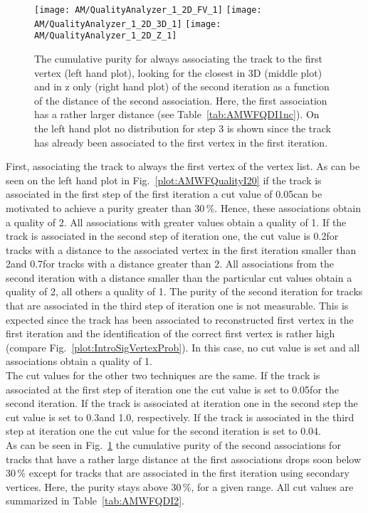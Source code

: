 \begin{figure}[!ht]
    \centering
    \texttt{[image: AM/QualityAnalyzer\_1\_2D\_FV\_1]}
    \texttt{[image: AM/QualityAnalyzer\_1\_2D\_3D\_1]}
    \texttt{[image: AM/QualityAnalyzer\_1\_2D\_Z\_1]}
    \caption[Cumulative purity of iteration two vs relative difference to define quality for larger distances of association one]{The cumulative purity for always associating the track to the first vertex (left hand plot), looking for the closest in 3D (middle plot) and in z only (right hand plot) of the second iteration as a function of the distance of the second association. Here, the first association has a rather larger distance (see Table~\ref{tab:AMWFQDI1nc}). On the left hand plot no distribution for step 3 is shown since the track has already been associated to the first vertex in the first iteration. \label{plot:AMWFQualityI21}}
\end{figure}

First, associating the track to always the first vertex of the vertex list. As can be seen on the left hand plot in Fig.~\ref{plot:AMWFQualityI20} if the track is associated in the first step of the first iteration a cut value of 0.05\cm can be motivated to achieve a purity greater than $30\,\%$. Hence, these associations obtain a quality of 2. All associations with greater values obtain a quality of 1. If the track is associated in the second step of iteration one, the cut value is 0.2\cm for tracks with a distance to the associated vertex in the first iteration smaller than 2\cm and 0.7\cm for tracks with a distance greater than 2\cm. All associations from the second iteration with a distance smaller than the particular cut values obtain a quality of 2, all others a quality of 1. The purity of the second iteration for tracks that are associated in the third step of iteration one is not measurable. This is expected since the track has been associated to reconstructed first vertex in the first iteration and the identification of the correct first vertex is rather high (compare Fig.~\ref{plot:IntroSigVertexProb}). In this case, no cut value is set and all associations obtain a quality of 1.\\
The cut values for the other two techniques are the same. If the track is associated at the first step of iteration one the cut value is set to 0.05\cm for the second iteration. If the track is associated at iteration one in the second step the cut value is set to 0.3\cm and 1.0\cm, respectively. If the track is associated in the third step at iteration one the cut value for the second iteration is set to 0.04\cm. \\
As can be seen in Fig.~\ref{plot:AMWFQualityI21} the cumulative purity of the second associations for tracks that have a rather large distance at the first associations drops soon below $30\,\%$ except for tracks that are associated in the first iteration using secondary vertices. Here, the purity stays above $30\,\%$, for a given range. All cut values are summarized in Table~\ref{tab:AMWFQDI2}.

